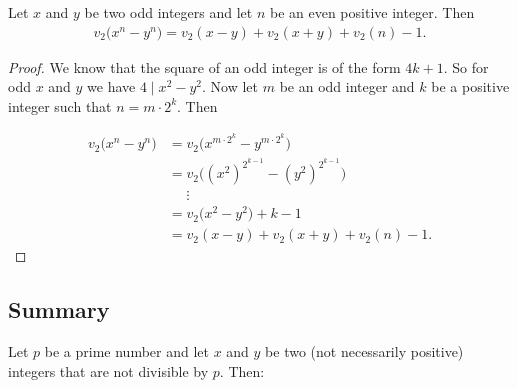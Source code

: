 \documentclass[main.tex]{subfile}
\begin{document}
    \begin{theorem}
        Let $x$ and $y$ be two odd integers and let $n$ be an even positive integer. Then
        \begin{align*}
        v_2\big(  x^n - y^n \big) = v_2(  x - y )+v_2(  x + y )+v_2(  n )-1.
        \end{align*}
    \end{theorem}

    \begin{proof}
        We know that the square of an odd integer is of the form $4k+1.$ So for odd $x$ and $y$ we have $4 \mid x^2-y^2.$ Now let $m$ be an odd integer and $k$ be a positive integer such that $n=m \cdot 2^k.$ Then

            \begin{align*}
                v_2 \big( x^{n} - y^{n} \big)  & = v_2\big( x^{m \cdot 2^{k}} - y^{m \cdot 2^{k}} \big)   \\
                & = v_2\big((x^2)^{2^{k-1}}-(y^2)^{2^{k-1}}\big) \\
                & \phantom{=} \vdots \\
                & =  v_2 \big( x^{2} - y^{2} \big) + k-1  \\
                & = v_2 ( x - y )+v_2 ( x + y )+v_2 ( n )-1.
            \end{align*}
    \end{proof}

\subsection{Summary}

    Let $p$ be a prime number and let $x$ and $y$ be two (not necessarily positive) integers that are not divisible by $p.$ Then:
\end{document}
